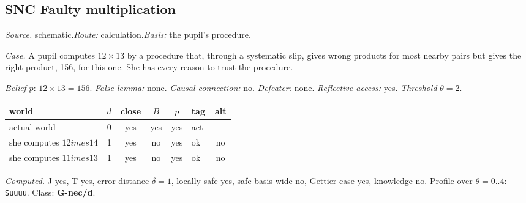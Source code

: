 \subsection*{SNC \enspace Faulty multiplication}
\noindent\textit{Source.} schematic.\quad \textit{Route:} calculation.\quad \textit{Basis:} the pupil's procedure.\par
\noindent\textit{Case.} A pupil computes $12 \times 13$ by a procedure that, through a systematic slip, gives wrong products for most nearby pairs but gives the right product, 156, for this one. She has every reason to trust the procedure.\par
\noindent\textit{Belief} $p$: $12 \times 13 = 156$.
 \textit{False lemma:} none. \textit{Causal connection:} no. \textit{Defeater:} none. \textit{Reflective access:} yes. \textit{Threshold} $\theta = 2$.\par
\begin{center}\begin{tabular}{@{}p{0.43\linewidth}rccclc@{}}
world & $d$ & close & $B$ & $p$ & tag & alt \\ \midrule
actual world & 0 & yes & yes & yes & act & -- \\
she computes $12 	imes 14$ & 1 & yes & no & yes & ok & no \\
she computes $11 	imes 13$ & 1 & yes & no & yes & ok & no \\
\end{tabular}\end{center}
\noindent\textit{Computed.} J yes, T yes, error distance $\delta = 1$, locally safe yes, safe basis-wide no, Gettier case yes, knowledge no. Profile over $\theta = 0..4$: \texttt{Suuuu}. Class: \textbf{G-nec/d}.
\par\medskip
{}
